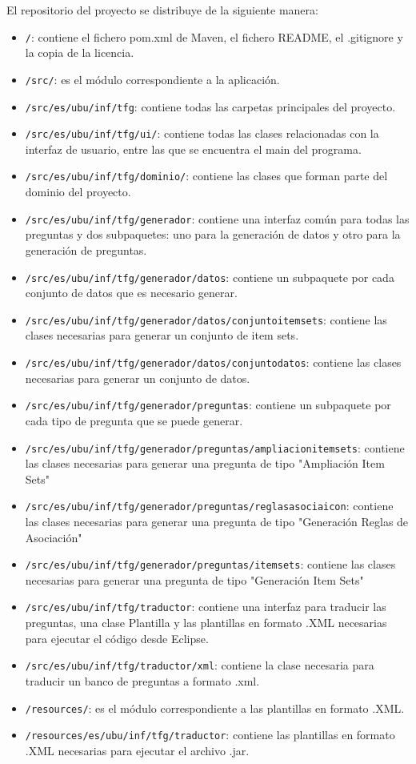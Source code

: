 El repositorio del proyecto se distribuye de la siguiente manera:
\begin{itemize}
\tightlist
\item
  \texttt{/}: contiene el fichero pom.xml de Maven, el fichero README, el .gitignore y la copia de la licencia.
\item
  \texttt{/src/}: es el módulo correspondiente a la aplicación.
\item
  \texttt{/src/es/ubu/inf/tfg}: contiene todas las carpetas principales del proyecto.
\item
  \texttt{/src/es/ubu/inf/tfg/ui/}: contiene todas las clases relacionadas con la interfaz de usuario, entre las que se encuentra el main del programa.
\item
  \texttt{/src/es/ubu/inf/tfg/dominio/}: contiene las clases que forman parte del dominio del proyecto.
\item
  \texttt{/src/es/ubu/inf/tfg/generador}: contiene una interfaz común para todas las preguntas y dos subpaquetes: uno para la generación de datos y otro para la generación de preguntas.
\item
  \texttt{/src/es/ubu/inf/tfg/generador/datos}: contiene un subpaquete por cada conjunto de datos que es necesario generar.
\item 
  \texttt{/src/es/ubu/inf/tfg/generador/datos/conjuntoitemsets}: contiene las clases necesarias para generar un conjunto de item sets.
\item
  \texttt{/src/es/ubu/inf/tfg/generador/datos/conjuntodatos}: contiene las clases necesarias para generar un conjunto de datos.
\item
  \texttt{/src/es/ubu/inf/tfg/generador/preguntas}: contiene un subpaquete por cada tipo de pregunta que se puede generar.
\item
\texttt{/src/es/ubu/inf/tfg/generador/preguntas/ampliacionitemsets}: contiene las clases necesarias para generar una pregunta de tipo "Ampliación Item Sets"
\item \texttt{/src/es/ubu/inf/tfg/generador/preguntas/reglasasociaicon}: contiene las clases necesarias para generar una pregunta de tipo "Generación Reglas de Asociación"
\item
  \texttt{/src/es/ubu/inf/tfg/generador/preguntas/itemsets}: contiene las clases necesarias para generar una pregunta de tipo "Generación Item Sets"
\item
  \texttt{/src/es/ubu/inf/tfg/traductor}: contiene una interfaz para traducir las preguntas, una clase Plantilla y las plantillas en formato .XML necesarias para ejecutar el código desde Eclipse.
\item
  \texttt{/src/es/ubu/inf/tfg/traductor/xml}: contiene la clase necesaria para traducir un banco de preguntas a formato .xml.
\item
  \texttt{/resources/}: es el módulo correspondiente a las plantillas en formato .XML.
\item
  \texttt{/resources/es/ubu/inf/tfg/traductor}: contiene las plantillas en formato .XML necesarias para ejecutar el archivo .jar.
\end{itemize}

